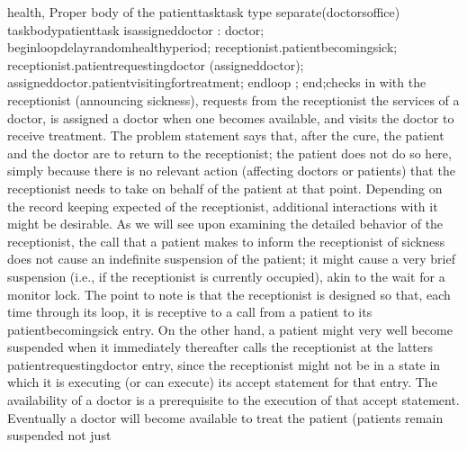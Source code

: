health,
\Parbox[]
Proper body of the %
\tyxffmxmono[]patient\Symuns[]task\tyxffmxendmono[] task type%
\FgEndcap[]
\Comp[]\tyxtstxbf[]separate\tyxtstxendbf[] (doctors\Symuns[]office)
\tyxtstxbf[]task\tyxtstxendbf[] \tyxtstxbf[]body\tyxtstxendbf[] patient\Symuns[]task %
\tyxtstxbf[]is\tyxtstxendbf[]
   assigned\Symuns[]doctor : doctor;
\tyxtstxbf[]begin\tyxtstxendbf[]
   \tyxtstxbf[]loop\tyxtstxendbf[]
      \tyxtstxbf[]delay\tyxtstxendbf[] random\Symuns[]healthy\Symuns[]period;
      receptionist.patient\Symuns[]becoming\Symuns[]sick;
      receptionist.patient\Symuns[]requesting\Symuns[]doctor (assigned\Symuns[]doctor);
      assigned\Symuns[]doctor.patient\Symuns[]visiting\Symuns[]for\Symuns[]treatment;
   \tyxtstxbf[]end\tyxtstxendbf[] \tyxtstxbf[]loop%
\tyxtstxendbf[];
\tyxtstxbf[]end\tyxtstxendbf[];\Endcomp[]
\EndParbox[]
\FgEndblock[]
 checks in with the receptionist (announcing sickness), requests from
the receptionist the services of a doctor, is assigned a doctor when
one becomes available, and visits the doctor to receive treatment.
The problem statement says that, after the cure, the patient and the
doctor are to return to the receptionist; the patient does not do
so here, simply because there is no relevant action (affecting doctors
or patients) that the receptionist needs to take on behalf of the
patient at that point. Depending on the record keeping expected of
the receptionist, additional interactions with it might be desirable.%
\Endpara[]
\Para[]As we will see upon examining the detailed behavior of the
receptionist, the call that a patient makes to inform the receptionist
of sickness does not cause an indefinite suspension of the patient;
it might cause a very brief suspension (i.e., if the receptionist
is currently occupied), akin to the wait for a monitor lock. The point
to note is that the receptionist is designed so that, each time through
its loop, it is receptive to a call from a patient to its %
\tyxffmxmono[]patient\Symuns[]becoming\Symuns[]sick%
\tyxffmxendmono[] entry. On the other hand, a patient might very well
become suspended when it immediately thereafter calls the receptionist
at the latter\rsquo[]s \tyxffmxmono[]patient\Symuns[]requesting\Symuns[]doctor%
\tyxffmxendmono[] entry, since the receptionist might not be in a
state in which it is executing (or can execute) its accept statement
for that entry. The availability of a doctor is a prerequisite to
the execution of that accept statement. Eventually a doctor will become
available to treat the patient (patients remain suspended not just
